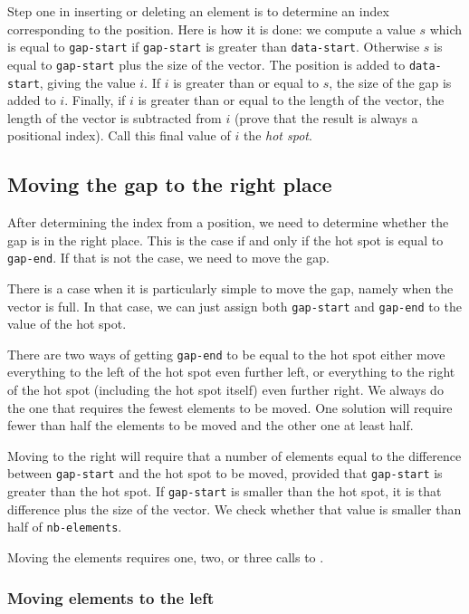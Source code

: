 \documentclass[11pt]{article}
\begin{document}
Step one in inserting or deleting an element is to determine an index
corresponding to the position.  Here is how it is done: we compute a
value $s$ which is equal to \texttt{gap-start} if \texttt{gap-start}
is greater than \texttt{data-start}.  Otherwise $s$ is equal to
\texttt{gap-start} plus the size of the vector.  The position is added
to \texttt{data-start}, giving the value $i$.  If $i$ is greater than
or equal to $s$, the size of the gap is added to $i$.  Finally, if $i$
is greater than or equal to the length of the vector, the length of
the vector is subtracted from $i$ (prove that the result is always a
positional index).  Call this final value of $i$ the \textit{hot
spot}.

\subsection{Moving the gap to the right place}

After determining the index from a position, we need to determine
whether the gap is in the right place.  This is the case if and only
if the hot spot is equal to \texttt{gap-end}.  If that is not the
case, we need to move the gap.

There is a case when it is particularly simple to move the gap, namely
when the vector is full.  In that case, we can just assign both
\texttt{gap-start} and \texttt{gap-end} to the value of the hot spot. 

There are two ways of getting \texttt{gap-end} to be equal to the hot
spot either move everything to the left of the hot spot even further
left, or everything to the right of the hot spot (including the hot
spot itself) even further right. We always do the one that requires
the fewest elements to be moved.  One solution will require fewer than
half the elements to be moved and the other one at least half.  

Moving to the right will require that a number of elements equal to
the difference between \texttt{gap-start} and the hot spot to be
moved, provided that \texttt{gap-start} is greater than the hot spot.
If \texttt{gap-start} is smaller than the hot spot, it is that
difference plus the size of the vector. We check whether that value is
smaller than half of \texttt{nb-elements}. 

Moving the elements requires one, two, or three calls to .

\subsubsection{Moving elements to the left}
\end{document}
